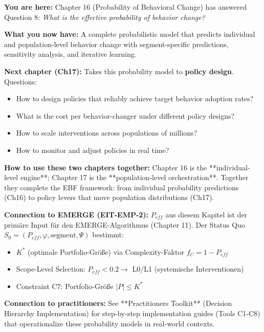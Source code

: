 \begin{tcolorbox}[colback=green!10!white, colframe=green!75!black, title=Reading Path: To Chapter 17 (Policy Applications)]

\textbf{You are here:} Chapter 16 (Probability of Behavioral Change) has answered Question 8: \textit{What is the effective probability of behavior change?}

\textbf{What you now have:} A complete probabilistic model that predicts individual and population-level behavior change with segment-specific predictions, sensitivity analysis, and iterative learning.

\textbf{Next chapter (Ch17):} Takes this probability model to \textbf{policy design}. Questions:
\begin{itemize}[nosep]
    \item How to design policies that reliably achieve target behavior adoption rates?
    \item What is the cost per behavior-changer under different policy designs?
    \item How to scale interventions across populations of millions?
    \item How to monitor and adjust policies in real time?
\end{itemize}

\textbf{How to use these two chapters together:} Chapter 16 is the **individual-level engine**; Chapter 17 is the **population-level orchestration**. Together they complete the EBF framework: from individual probability predictions (Ch16) to policy levers that move population distributions (Ch17).

\textbf{Connection to EMERGE (EIT-EMP-2):} $P_{eff}$ aus diesem Kapitel ist der primäre Input für den EMERGE-Algorithmus (Chapter 11). Der Status Quo $S_0 = (P_{eff}, \varphi, \text{segment}, \Psi)$ bestimmt:
\begin{itemize}[nosep]
    \item $K^*$ (optimale Portfolio-Größe) via Complexity-Faktor $f_C = 1 - P_{eff}$
    \item Scope-Level Selection: $P_{eff} < 0.2 \to$ L0/L1 (systemische Interventionen)
    \item Constraint C7: Portfolio-Größe $|P| \leq K^*$
\end{itemize}

\textbf{Connection to practitioners:} See **Practitioners Toolkit** (Decision Hierarchy Implementation) for step-by-step implementation guides (Tools C1-C8) that operationalize these probability models in real-world contexts.

\end{tcolorbox}

